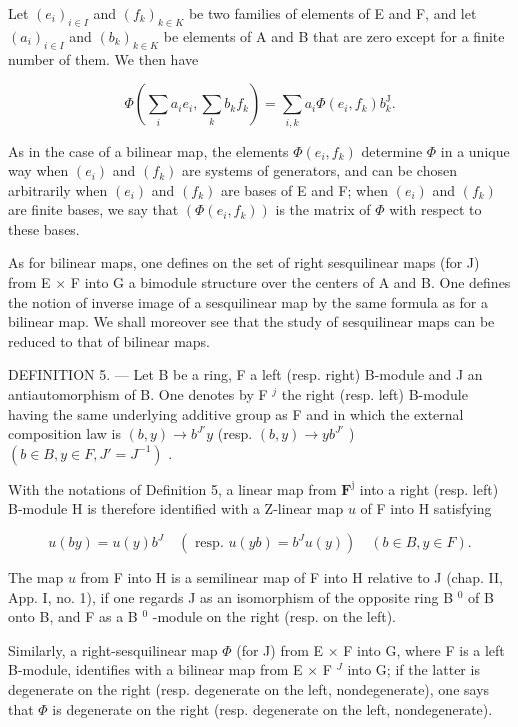 Let \((e_i)_{i\in I}\) and \((f_k)_{k\in K}\) be two families of elements of E and F, and let \((a_i)_{i\in I}\) and \((b_k)_{k\in K}\) be elements of A and B that are zero except for a finite number of them. We then have

\[
\Phi (\sum_ {i} a _ {i} e _ {i}, \sum_ {k} b _ {k} f _ {k}) = \sum_ {i, k} a _ {i} \Phi (e _ {i}, f _ {k}) b _ {k} ^ {\mathrm{J}}.\tag{8}
\]

As in the case of a bilinear map, the elements \(\Phi(e_i, f_k)\) determine \(\Phi\) in a unique way when \((e_i)\) and \((f_k)\) are systems of generators, and can be chosen arbitrarily when \((e_i)\) and \((f_k)\) are bases of E and F; when \((e_i)\) and \((f_k)\) are finite bases, we say that \((\Phi(e_i, f_k))\) is the matrix of \(\Phi\) with respect to these bases.

As for bilinear maps, one defines on the set of right sesquilinear maps (for J) from E × F into G a bimodule structure over the centers of A and B. One defines the notion of inverse image of a sesquilinear map by the same formula as for a bilinear map. We shall moreover see that the study of sesquilinear maps can be reduced to that of bilinear maps.

DEFINITION 5. --- Let B be a ring, F a left (resp. right) B-module and J an antiautomorphism of B. One denotes by F \(^{j}\) the right (resp. left) B-module having the same underlying additive group as F and in which the external composition law is \((b, y) \to b^{J'}y\) (resp. \((b, y) \to yb^{J'}\) ) \((b \in B, y \in F, J' = J^{-1})\) .

With the notations of Definition 5, a linear map from \(\mathbf{F}^{\mathrm{j}}\) into a right (resp. left) B-module H is therefore identified with a Z-linear map \(u\) of F into H satisfying

\[
u (b y) = u (y) b ^ {J} \quad (\text { resp. } u (y b) = b ^ {J} u (y)) \quad (b \in B, y \in F).
\]

The map \(u\) from F into H is a semilinear map of F into H relative to J (chap. II, App. I, no. 1), if one regards J as an isomorphism of the opposite ring B \(^{0}\) of B onto B, and F as a B \(^{0}\) -module on the right (resp. on the left).

Similarly, a right-sesquilinear map \(\Phi\) (for J) from E × F into G, where F is a left B-module, identifies with a bilinear map from E × F \(^{J}\) into G; if the latter is degenerate on the right (resp. degenerate on the left, nondegenerate), one says that \(\Phi\) is degenerate on the right (resp. degenerate on the left, nondegenerate).


